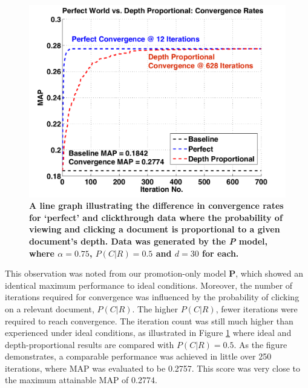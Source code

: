 \begin{figure}
	\begin{center}
	\includegraphics[width=\linewidth]{pics/bias/bias_iterations.pdf}
	\end{center}
	\vspace{-0.5cm}
	\caption{\label{fig:bias_iterations}\textbf{A line graph illustrating the difference in convergence rates for `perfect' and clickthrough data where the probability of viewing and clicking a document is proportional to a given document's depth. Data was generated by the \emph{P} model, where $\alpha = 0.75$, $P(C|R)=0.5$ and $d=30$ for each.}\vspace{-0.5cm}}
\end{figure}

This observation was noted from our promotion-only model \textbf{P}, which showed an identical maximum performance to ideal conditions. Moreover, the number of iterations required for convergence was influenced by the probability of clicking on a relevant document, $P(C|R)$. The higher $P(C|R)$, fewer iterations were required to reach convergence. The iteration count was still much higher than experienced under ideal conditions, as illustrated in Figure \ref{fig:bias_iterations} where ideal and depth-proportional results are compared with $P(C|R) = 0.5$. As the figure demonstrates, a comparable performance was achieved in little over 250 iterations, where MAP was evaluated to be 0.2757. This score was very close to the maximum attainable MAP of 0.2774.

